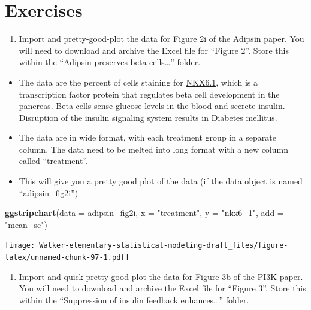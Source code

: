 \documentclass[]{book}
\newenvironment{Shaded}{\begin{snugshade}}{\end{snugshade}}
\newcommand{\DataTypeTok}[1]{\textcolor[rgb]{0.13,0.29,0.53}{#1}}
\newcommand{\KeywordTok}[1]{\textcolor[rgb]{0.13,0.29,0.53}{\textbf{#1}}}
\newcommand{\NormalTok}[1]{#1}
\newcommand{\StringTok}[1]{\textcolor[rgb]{0.31,0.60,0.02}{#1}}
\providecommand{\tightlist}{%
  \setlength{\itemsep}{0pt}\setlength{\parskip}{0pt}}
\begin{document}
\hypertarget{exercises}{%
\section{Exercises}\label{exercises}}

\begin{enumerate}
\def\labelenumi{\arabic{enumi}.}
\tightlist
\item
  Import and pretty-good-plot the data for Figure 2i of the Adipsin paper. You will need to download and archive the Excel file for ``Figure 2''. Store this within the ``Adipsin preserves beta cells\ldots{}'' folder.
\end{enumerate}

\begin{itemize}
\tightlist
\item
  The data are the percent of cells staining for \href{https://en.wikipedia.org/wiki/NKX6-1}{NKX6.1}, which is a transcription factor protein that regulates beta cell development in the pancreas. Beta cells sense glucose levels in the blood and secrete insulin. Disruption of the insulin signaling system results in Diabetes mellitus.
\item
  The data are in wide format, with each treatment group in a separate column. The data need to be melted into long format with a new column called ``treatment''.
\item
  This will give you a pretty good plot of the data (if the data object is named ``adipsin\_fig2i'')
\end{itemize}

\begin{Shaded}
\begin{Highlighting}[]
\KeywordTok{ggstripchart}\NormalTok{(}\DataTypeTok{data =}\NormalTok{ adipsin_fig2i,}
             \DataTypeTok{x =} \StringTok{"treatment"}\NormalTok{,}
             \DataTypeTok{y =} \StringTok{"nkx6_1"}\NormalTok{,}
             \DataTypeTok{add =} \StringTok{"mean_se"}\NormalTok{)}
\end{Highlighting}
\end{Shaded}

\texttt{[image: Walker-elementary-statistical-modeling-draft\_files/figure-latex/unnamed-chunk-97-1.pdf]}

\begin{enumerate}
\def\labelenumi{\arabic{enumi}.}
\setcounter{enumi}{1}
\tightlist
\item
  Import and quick pretty-good-plot the data for Figure 3b of the PI3K paper. You will need to download and archive the Excel file for ``Figure 3''. Store this within the ``Suppression of insulin feedback enhances\ldots{}'' folder.
\end{enumerate}
\end{document}
